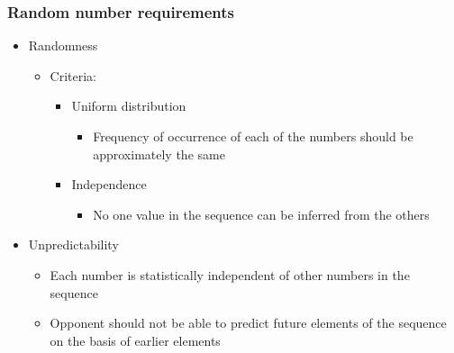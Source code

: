 \documentclass{article}
\begin{document}
                            \subsubsection{Random number requirements}
                            \begin{itemize}
                                \item Randomness
                                \begin{itemize}
                                    \item Criteria:
                                    \begin{itemize}
                                        \item Uniform distribution
                                        \begin{itemize}
                                            \item Frequency of occurrence of each of the numbers should be approximately the same
                                        \end{itemize}
                        
                                        
                                        \item Independence
                                        \begin{itemize}
                                            \item No one value in the sequence can be inferred from the others
                                        \end{itemize}
                                    \end{itemize}
                                \end{itemize}
                                \item Unpredictability
                                        \begin{itemize}
                                            \item Each number is statistically independent of other numbers in the sequence
                                            \item Opponent should not be able to predict future elements of the sequence on the basis of earlier elements
                                        \end{itemize}
                                    \end{itemize}
\end{document}
